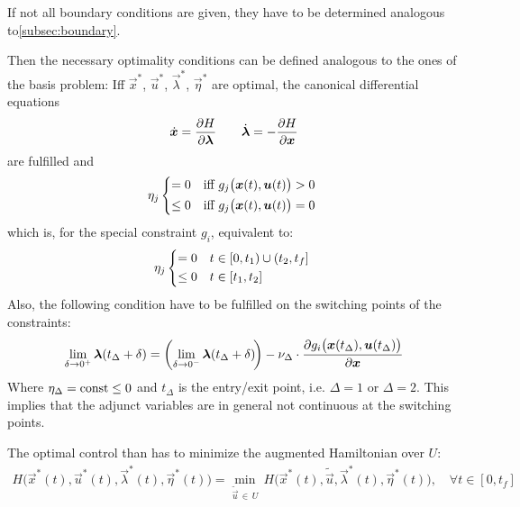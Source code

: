 				If not all boundary conditions are given, they have to be determined analogous to\autoref{subsec:boundary}.

				Then the necessary optimality conditions can be defined analogous to the ones of the basis problem: Iff \( \vec{x}^\ast \), \( \vec{u}^\ast \), \( \vec{\lambda}^\ast \), \( \vec{\eta}^\ast \) are optimal, the canonical differential equations
				\begin{align*}
					\dot{\bm{x}} = \pdv{H}{\bm{\lambda}} \qquad \dot{\bm{\lambda}} = -\pdv{H}{\bm{x}}
				\end{align*}
				are fulfilled and
				\begin{align*}
					\eta_j
						\begin{cases*}
							= 0    & iff \( g_j\big(\vec{x}(t), \vec{u}(t)\big) > 0 \) \\
							\leq 0 & iff \( g_j\big(\vec{x}(t), \vec{u}(t)\big) = 0 \)
						\end{cases*}
				\end{align*}
				which is, for the special constraint \(g_i\), equivalent to:
				\begin{align*}
					\eta_j
						\begin{cases*}
							= 0    & \( t \in [0, t_1) \cup (t_2, t_f] \) \\
							\leq 0 & \( t \in [t_1, t_2] \)
						\end{cases*}
				\end{align*}
				Also, the following condition have to be fulfilled on the switching points of the constraints:
				\begin{align*}
					\lim\limits_{\delta \to 0^+} \bm{\lambda}(t_\Delta + \delta) = \bigg(\! \lim\limits_{\delta \to 0^-} \bm{\lambda}(t_\Delta + \delta) \!\bigg) - \nu_\Delta \cdot \pdv{g_i\big(\bm{x}(t_\Delta), \bm{u}(t_\Delta)\big)}{\bm{x}}
				\end{align*}
				Where \( \eta_\Delta = \operatorname{const} \leq 0 \) and \( t_\Delta \) is the entry/exit point, i.e. \( \Delta = 1 \) or \( \Delta = 2 \). This implies that the adjunct variables are in general not continuous at the switching points.

				The optimal control than has to minimize the augmented Hamiltonian over \(U\):
				\begin{align}
					H\big(\vec{x}^\ast(t), \vec{u}^\ast(t), \vec{\lambda}^\ast(t), \vec{\eta}^\ast(t)\big) = \min_{\tilde{\vec{u}} \,\in\, U} \, H\big(\vec{x}^\ast(t), \tilde{\vec{u}}, \vec{\lambda}^\ast(t), \vec{\eta}^\ast(t)\big),\quad \forall t \in [0, t_f]  \label{eq:constrainedMax}
				\end{align}

